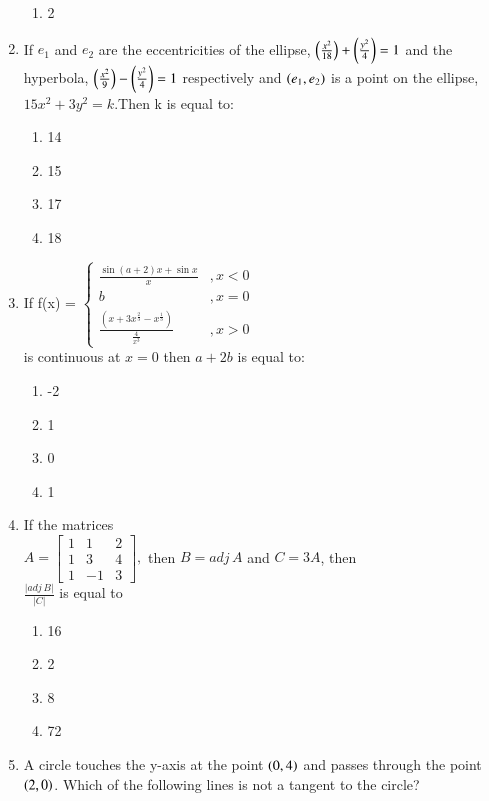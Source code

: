 \documentclass[journal,12pt,twocolumn]{IEEEtran}
\theoremstyle{remark}
\begin{document}
\begin{enumerate}
\begin{enumerate}
       \item 2
   \end{enumerate}
   \item If $e_{1}$ and $e_{2}$ are the eccentricities of the ellipse, $\left(\frac{x^{2}}{18}\right)+\left(\frac{y^{2}}{4}\right)=1$ and the hyperbola, $\left(\frac{x^{2}}{9}\right)-\left(\frac{y^{2}}{4}\right)=1$ respectively and $\left(e_{1},e_{2}\right)$
  is a point on the ellipse,$15x^{2}+3y^{2}=k$.Then k is equal to$\colon$
   \begin{enumerate}
       \item 14
       \item 15
       \item 17
       \item 18
   \end{enumerate}
   \item If f(x) =
$\begin{cases}
\frac{\sin(a+2)x + \sin x}{x}&,x < 0 \\
b&,x = 0 \\
\frac{(x + 3x^{\frac{2}{3}} - x^{\frac{1}{3}})}{\frac{4}{x^3}}&,x > 0
\end{cases}$\\is continuous at $x=0$ then $a+2b$ is equal to$\colon$
\begin{enumerate}
    \item -2
    \item 1
    \item 0
    \item 1
\end{enumerate}
\item If the matrices\\
$A=\begin{bmatrix}
1&1&2\\1&3&4\\1&-1&3\end{bmatrix},$ then $B=adj\,A$ and $C=3A$, then\\$\frac{\lvert adj\,B \rvert}{\lvert C \rvert}$ is equal to
\begin{enumerate}
    \item 16
    \item 2
    \item 8
    \item 72
\end{enumerate}
\item A circle touches the y-axis at the point $\left(0,4\right)$ and passes through the point $\left(2,0\right)$. Which of the following lines is not a tangent to the circle?
\begin{enumerate}

\end{enumerate}
\end{enumerate}
\end{document}

